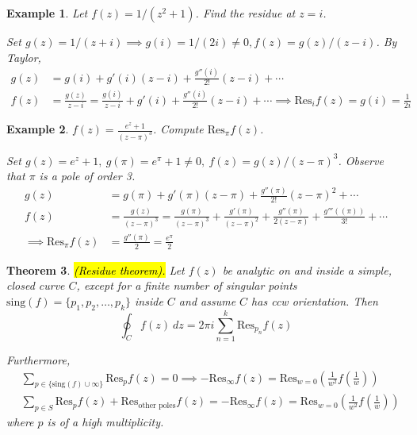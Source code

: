 \documentclass{article}
\newtheorem{theorem}{Theorem}[section]
\newtheorem{example}[theorem]{Example}
\theoremstyle{definition}
\begin{document}
\begin{example} \normalfont
    Let $f(z) = 1/(z^2+1)$. Find the residue at $z = i$.
    
    Set $g(z) = 1/(z+i) \implies g(i) = 1/(2i) \neq 0, f(z) = g(z) / (z-i)$. By Taylor,
    \begin{align*}
        g(z) &= g(i) + g'(i) (z-i) + \frac{g''(i)}{2!} (z-i) + \cdots \\
        f(z) &= \frac{g(z)}{z-i} = \frac{g(i)}{z-i} + g'(i) + \frac{g''(i)}{2!} (z-i) + \cdots \implies \text{Res}_i f(z) = g(i) = \frac{1}{2i}
    \end{align*}
\end{example}

\begin{example} \normalfont
    $f(z) = \frac{e^z+1}{(z-\pi)^3}$. Compute $\text{Res}_\pi f(z)$.

    Set $g(z) = e^z+1,\ g(\pi) = e^\pi + 1 \neq 0,\ f(z) = g(z) / (z-\pi)^3$. Observe that $\pi$ is a pole of order 3.
    \begin{align*}
        g(z) &= g(\pi) + g'(\pi) (z-\pi) + \frac{g''(\pi)}{2!} (z-\pi)^2 + \cdots \\
        f(z) &= \frac{g(z)}{(z-\pi)^3} = \frac{g(\pi)}{(z-\pi)^3} + \frac{g'(\pi)}{(z-\pi)^2} + \frac{g''(\pi)}{2(z-\pi)} + \frac{g'''((\pi))}{3!} + \cdots \\
        \implies \text{Res}_\pi f(z) &= \frac{g''(\pi)}{2} = \frac{e^\pi}{2}
    \end{align*}
\end{example}

\begin{theorem}
    \hl{(Residue theorem).} Let $f(z)$ be analytic on and inside a simple, closed curve $C$, except for a finite number of singular points $\text{sing}(f) = \{ p_1, p_2, \dots, p_k \}$ inside $C$ and assume $C$ has ccw orientation. Then
    \begin{equation*}
        \oint_C f(z)\ dz = 2 \pi i \sum_{n=1}^k \text{Res}_{p_n} f(z)
    \end{equation*}

    Furthermore,
    \begin{align*}
        &\sum_{p \in \{ \text{sing}(f) \cup \infty \}} \text{Res}_p f(z) = 0 \implies -\text{Res}_\infty f(z) = \text{Res}_{w=0} \left( \frac{1}{w^2} f \left(\frac{1}{w}\right) \right) \\
        &\sum_{p \in S} \text{Res}_p f(z) + \text{Res}_{\text{other poles}} f(z) = -\text{Res}_\infty f(z) = \text{Res}_{w=0} \left( \frac{1}{w^2} f \left(\frac{1}{w}\right) \right)
    \end{align*}
    where $p$ is of a high multiplicity.
\end{theorem}
\end{document}
